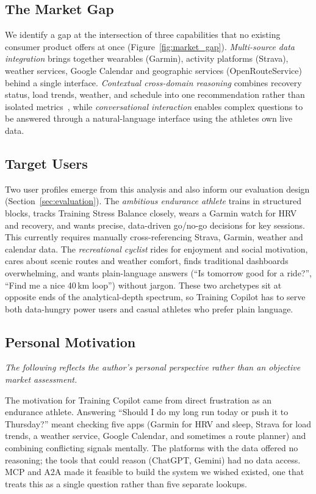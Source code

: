 \subsection{The Market Gap}\label{sec:market:gap}

We identify a gap at the intersection of three capabilities that no existing consumer product offers at once (Figure~\ref{fig:market_gap}). \textit{Multi-source data integration} brings together wearables (Garmin), activity platforms (Strava), weather services, Google Calendar and geographic services (OpenRouteService) behind a single interface. \textit{Contextual cross-domain reasoning} combines recovery status, load trends, weather, and schedule into one recommendation rather than isolated metrics~\citep{bourdon_monitoring_2017}, while \textit{conversational interaction} enables complex questions to be answered through a natural-language interface using the athletes own live data.



\subsection{Target Users}\label{sec:market:users}

Two user profiles emerge from this analysis and also inform our evaluation design (Section~\ref{sec:evaluation}). The \textit{ambitious endurance athlete} trains in structured blocks, tracks Training Stress Balance closely, wears a Garmin watch for HRV and recovery, and wants precise, data-driven go/no-go decisions for key sessions. This currently requires manually cross-referencing Strava, Garmin, weather and calendar data. The \textit{recreational cyclist} rides for enjoyment and social motivation, cares about scenic routes and weather comfort, finds traditional dashboards overwhelming, and wants plain-language answers (``Is tomorrow good for a ride?'', ``Find me a nice 40\,km loop'') without jargon. These two archetypes sit at opposite ends of the analytical-depth spectrum, so Training Copilot has to serve both data-hungry power users and casual athletes who prefer plain language.

\subsection{Personal Motivation}\label{sec:market:motivation}

\textit{The following reflects the author's personal perspective rather than an objective market assessment.}

The motivation for Training Copilot came from direct frustration as an endurance athlete. Answering ``Should I do my long run today or push it to Thursday?'' meant checking five apps (Garmin for HRV and sleep, Strava for load trends, a weather service, Google Calendar, and sometimes a route planner) and combining conflicting signals mentally. The platforms with the data offered no reasoning; the tools that could reason (ChatGPT, Gemini) had no data access. MCP and A2A made it feasible to build the system we wished existed, one that treats this as a single question rather than five separate lookups.
